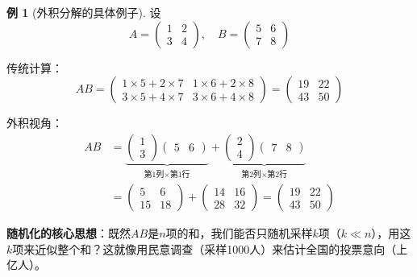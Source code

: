 \documentclass[11pt,a4paper]{ctexart}
\theoremstyle{definition}
\newtheorem{example}[theorem]{例}
\theoremstyle{remark}
\begin{document}
\begin{example}[外积分解的具体例子]
设
\[
A = \begin{pmatrix} 1 & 2 \\ 3 & 4 \end{pmatrix}, \quad B = \begin{pmatrix} 5 & 6 \\ 7 & 8 \end{pmatrix}
\]

传统计算：
\[
AB = \begin{pmatrix} 1\times5 + 2\times7 & 1\times6 + 2\times8 \\ 3\times5 + 4\times7 & 3\times6 + 4\times8 \end{pmatrix} = \begin{pmatrix} 19 & 22 \\ 43 & 50 \end{pmatrix}
\]

外积视角：
\begin{align*}
AB &= \underbrace{\begin{pmatrix} 1 \\ 3 \end{pmatrix} \begin{pmatrix} 5 & 6 \end{pmatrix}}_{\text{第1列} \times \text{第1行}} + \underbrace{\begin{pmatrix} 2 \\ 4 \end{pmatrix} \begin{pmatrix} 7 & 8 \end{pmatrix}}_{\text{第2列} \times \text{第2行}} \\
&= \begin{pmatrix} 5 & 6 \\ 15 & 18 \end{pmatrix} + \begin{pmatrix} 14 & 16 \\ 28 & 32 \end{pmatrix} = \begin{pmatrix} 19 & 22 \\ 43 & 50 \end{pmatrix}
\end{align*}
\end{example}

\textbf{随机化的核心思想}：既然$AB$是$n$项的和，我们能否只随机采样$k$项（$k \ll n$），用这$k$项来近似整个和？这就像用民意调查（采样1000人）来估计全国的投票意向（上亿人）。


\end{document}
